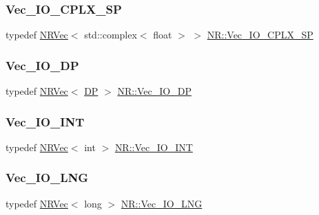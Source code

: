 \mbox{\label{namespaceNR_ae2d1431f9f152dfdbf891d3d131cf309}} 
\subsubsection{\texorpdfstring{Vec\_IO\_CPLX\_SP}{Vec\_IO\_CPLX\_SP}}
{\footnotesize\ttfamily typedef \mbox{\hyperlink{classNR_1_1NRVec}{N\+R\+Vec}}$<$ std\+::complex$<$ float $>$ $>$ \mbox{\hyperlink{namespaceNR_ae2d1431f9f152dfdbf891d3d131cf309}{N\+R\+::\+Vec\+\_\+\+I\+O\+\_\+\+C\+P\+L\+X\+\_\+\+SP}}}

\mbox{\label{namespaceNR_ab293e06a6bf799d8a7ed932b6852bcb8}} 
\subsubsection{\texorpdfstring{Vec\_IO\_DP}{Vec\_IO\_DP}}
{\footnotesize\ttfamily typedef \mbox{\hyperlink{classNR_1_1NRVec}{N\+R\+Vec}}$<$ \mbox{\hyperlink{namespaceNR_af6ff762dd605ff477b8e52387253a02a}{DP}} $>$ \mbox{\hyperlink{namespaceNR_ab293e06a6bf799d8a7ed932b6852bcb8}{N\+R\+::\+Vec\+\_\+\+I\+O\+\_\+\+DP}}}

\mbox{\label{namespaceNR_a3b8558419263875cc467f92b0ef4aba7}} 
\subsubsection{\texorpdfstring{Vec\_IO\_INT}{Vec\_IO\_INT}}
{\footnotesize\ttfamily typedef \mbox{\hyperlink{classNR_1_1NRVec}{N\+R\+Vec}}$<$ int $>$ \mbox{\hyperlink{namespaceNR_a3b8558419263875cc467f92b0ef4aba7}{N\+R\+::\+Vec\+\_\+\+I\+O\+\_\+\+I\+NT}}}

\mbox{\label{namespaceNR_ab3ee168d5645ca3b231102152fc5a433}} 
\subsubsection{\texorpdfstring{Vec\_IO\_LNG}{Vec\_IO\_LNG}}
{\footnotesize\ttfamily typedef \mbox{\hyperlink{classNR_1_1NRVec}{N\+R\+Vec}}$<$ long $>$ \mbox{\hyperlink{namespaceNR_ab3ee168d5645ca3b231102152fc5a433}{N\+R\+::\+Vec\+\_\+\+I\+O\+\_\+\+L\+NG}}}

